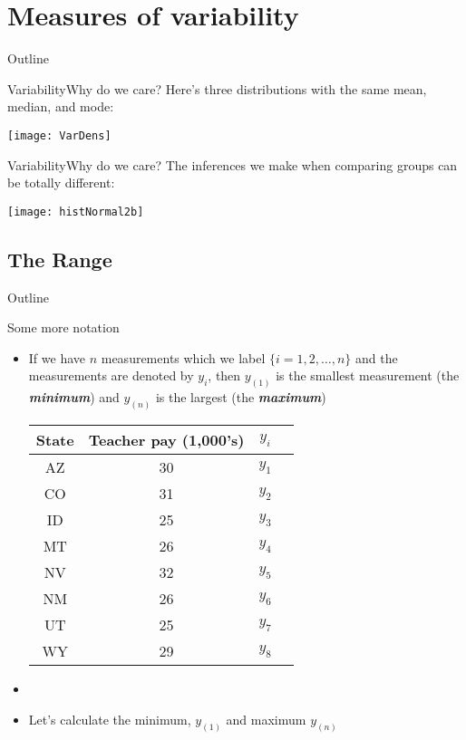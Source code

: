 \documentclass[xcolor=dvipsnames]{beamer}
\begin{document}
\section{Measures of variability}
\begin{frame}{Outline}
	\tableofcontents[currentsection,subsectionstyle=show/shaded/hide]
\end{frame}

\begin{frame}{Variability}{Why do we care?}
Here's three distributions with the same mean, median, and mode:
\begin{center}
	\texttt{[image: VarDens]}
\end{center}
\end{frame}

\begin{frame}{Variability}{Why do we care?}
The inferences we make when comparing groups can be totally different:
\begin{center}
\texttt{[image: histNormal2b]}
\end{center}
\end{frame}

\subsection{The Range}
\begin{frame}{Outline}
	\tableofcontents[currentsection,subsectionstyle=show/shaded/hide]
\end{frame}

\begin{frame}{Some more notation}
	\begin{itemize}
		\item If we have $n$ measurements which we label $\{i = 1, 2, \hdots, n\}$ and the measurements are denoted by $y_i$, then $y_{(1)}$ is the smallest measurement (the \textbf{\emph{minimum}}) and $y_{(n)}$ is the largest (the \textbf{\emph{maximum}}) \pause
			\begin{center}
			\begin{tabular}{|c|c|c|c|}
				\hline 
				\textbf{State} & \textbf{Teacher pay (1,000's)} & $y_i$ \\ 
				\hline \hline
				AZ & 30 & $y_1$\\ \hline 
				CO &  31 & $y_2$ \\ \hline 
				ID & 25 & $y_3$ \\  \hline 
				MT &  26 & $y_4$ \\ \hline 
				NV & 32 & $y_5$ \\ \hline 
				NM &  26 & $y_6$\\ \hline 
				UT &  25 & $y_7$\\ \hline 
				WY &  29 & $y_8$\\ \hline 
			\end{tabular} 
		\end{center} \pause
	\item[]
	\item Let's calculate the minimum, $y_{(1)}$ and maximum $y_{(n)}$
	\end{itemize}
\end{frame}
\end{document}
